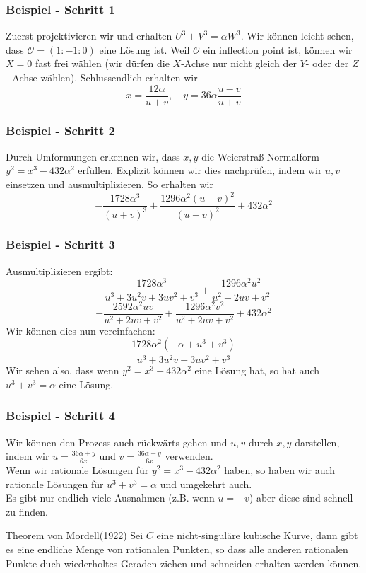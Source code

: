 \documentclass{beamer}
\begin{document}
\begin{frame}
\frametitle{Beispiel - Schritt 1}
	Zuerst projektivieren wir und erhalten $U^3+V^3 = \alpha W^3$.
	Wir können leicht sehen, dass \(\mathcal{O}=(1:-1:0)\) eine Lösung
	ist. Weil \(\mathcal{O}\) ein inflection point ist, können wir
	\(X=0\) fast frei wählen (wir dürfen die $X$-Achse nur nicht gleich
	der $Y$- oder der $Z$- Achse wählen).
	Schlussendlich erhalten wir
	\[x=\frac{12\alpha}{u+v}, \quad y=36\alpha\frac{u-v}{u+v}\]
\end{frame}

\begin{frame}
\frametitle{Beispiel - Schritt 2}
	Durch Umformungen erkennen wir, dass \(x,y\) die Weierstraß
	Normalform $y^2=x^3-432\alpha^2$ erfüllen.
	Explizit können wir dies nachprüfen, indem wir \(u,v\) einsetzen
	und ausmultiplizieren. So erhalten wir
	\[
		- \frac{1728 \alpha^{3}}{\left(u + v\right)^{3}} + \frac{1296 \alpha^{2} \left(u - v\right)^{2}}{\left(u + v\right)^{2}} + 432 \alpha^{2}
	\]
\end{frame}

\begin{frame}
\frametitle{Beispiel - Schritt 3}
	Ausmultiplizieren ergibt:
	\[ - \frac{1728 \alpha^{3}}{u^{3} + 3 u^{2} v + 3 u v^{2} + v^{3}} + \frac{1296 \alpha^{2} u^{2}}{u^{2} + 2 u v + v^{2}} \]
	\[- \frac{2592 \alpha^{2} u v}{u^{2} + 2 u v + v^{2}} + \frac{1296 \alpha^{2} v^{2}}{u^{2} + 2 u v + v^{2}} + 432 \alpha^{2}\]
	Wir können dies nun vereinfachen:
	\[ \frac{1728 \alpha^{2} \left(- \alpha + u^{3} + v^{3}\right)}{u^{3} + 3 u^{2} v + 3 u v^{2} + v^{3}} \]
	Wir sehen also, dass wenn \(y^2=x^3-432\alpha^2\) eine Lösung
	hat, so hat auch \(u^3+v^3=\alpha\) eine Lösung.
\end{frame}

\begin{frame}
\frametitle{Beispiel - Schritt 4}
	Wir können den Prozess auch rückwärts gehen und \(u,v\) durch
	\(x,y\) darstellen, indem wir
	$u=\frac{36\alpha+y}{6x}$ und $v=\frac{36\alpha-y}{6x}$ verwenden.
	\\
	Wenn wir rationale Lösungen für \(y^2=x^3-432\alpha^2\) haben,
	so haben wir auch rationale Lösungen für \(u^3+v^3=\alpha\) und
	umgekehrt auch.
	\\
	Es gibt nur endlich viele Ausnahmen (z.B. wenn \(u=-v\))
	aber diese sind schnell zu finden.
\end{frame}

\begin{frame}{Theorem von Mordell(1922)}
    Sei \(C\) eine nicht-singuläre kubische Kurve, dann gibt es eine endliche Menge von rationalen Punkten, so dass alle anderen rationalen Punkte duch wiederholtes Geraden ziehen und schneiden erhalten werden können.
\end{frame}
\end{document}
